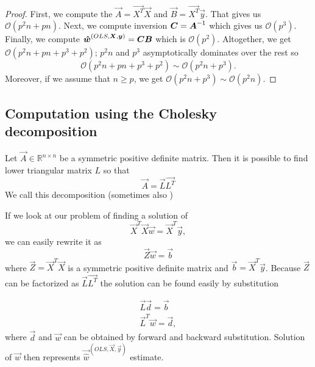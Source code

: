 \begin{proof}
First, we compute the
$\vec{A} = \vec{X^T}\vec{X}$  and
$\vec{B} = \vec{X^T}\vec{y}$. 
That gives us $\mathcal{O}(p^2n + pn)$.
Next, we compute inversion $\m{C} = \m{A}^{-1}$ which gives us $\mathcal{O}(p^3)$.
Finally, we compute
$ \vec{\hat{w}}^{(OLS,\vec{X}, \vec{y})} = \m{C}\m{B}$ which is $\mathcal{O}(p^2)$. 
Altogether, we get $ \mathcal{O}(p^2n + pn + p^3 + p^2)$;
$p^2n$ and $p^3$ asymptotically dominates over the rest so 
\begin{equation}
\mathcal{O}(p^2n + pn + p^3 + p^2) \sim \mathcal{O}(p^2n + p^3).
\end{equation}
Moreover, if we assume that $n \ge p$, we get $\mathcal{O}(p^2n + p^3) \sim \mathcal{O}(p^2n)$.
\end{proof}




\subsection{Computation using the Cholesky decomposition}

Let $\vec{A} \in \mathbb{R}^{n \times n}$ be a symmetric positive definite matrix. Then it is possible to find lower triangular matrix $L$ so that 
\begin{equation}
    \vec{A} = \vec{L}\vec{L^T}
\end{equation}
We call this decomposition  (sometimes also  )
    
If we look at our problem of finding a solution of 
\begin{equation}
    \vec{X}^T\vec{X}\vec{w} = \vec{X}^T\vec{y},
\end{equation}
we can easily rewrite it as 
\begin{equation}
    \vec{Z}\vec{w} = \vec{b}
\end{equation}
where $\vec{Z} = \vec{X}^T\vec{X}$ is a symmetric positive definite matrix and $\vec{b} = \vec{X}^T\vec{y} $. Because $\vec{Z}$ can be factorized as $\vec{L}\vec{L^T}$ the solution can be found easily by substitution

\begin{align}
    \vec{L}\vec{d} = \vec{b} \\
    \vec{L}^T\vec{w} = \vec{d},
\end{align}
where $\vec{d}$ and $\vec{w}$ can be obtained by forward and backward substitution. Solution of $\vec{w}$ then represents $\vec{\hat{w}}^{(OLS,\vec{X}, \vec{y})}$ estimate.

